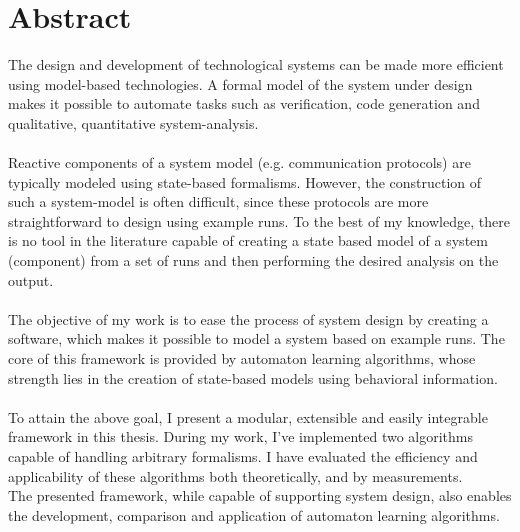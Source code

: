 \chapter*{Abstract}

The design and development of technological systems can be made more efficient using model-based technologies. A formal model of the system under design makes it possible to automate tasks such as verification, code generation and qualitative, quantitative system-analysis.
\\\\
Reactive components of a system model (e.g. communication protocols) are typically modeled using state-based formalisms. However, the construction of such a system-model is often difficult, since these protocols are more straightforward to design using example runs. To the best of my knowledge, there is no tool in the literature capable of creating  a state based model of a system (component) from a set of runs and then performing the desired analysis on the output.
\\\\
The objective of my work is to ease the process of system design by creating a software, which makes it possible to model a system based on example runs. The core of this framework is provided by automaton learning algorithms, whose strength lies in the creation of state-based models using behavioral information.
\\\\
To attain the above goal, I present a modular, extensible and easily integrable framework in this thesis. During my work, I've implemented two algorithms capable of handling arbitrary formalisms. I have evaluated the efficiency and applicability of these algorithms both theoretically, and by measurements.
\\
The presented framework, while capable of supporting system design, also enables the development, comparison and application of automaton learning algorithms.



\vfill
\selectthesislanguage

\setcounter{romanPage}{\value{page}}
